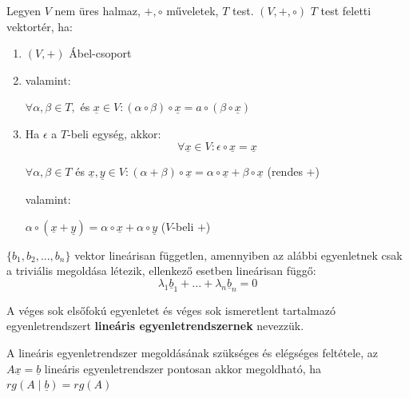 \documentclass[11pt,a4paper]{article}
\begin{document}
\begin{tcolorbox}[colback=blue!5!white,colframe=blue!70!black,title= 3. Vektortér]
    Legyen \(V\) nem üres halmaz, \(+, \circ \) műveletek, \(T\) test. \((V, +, \circ)\) \(T\) test feletti vektortér, ha:
    \begin{enumerate}
        \item \((V, +)\) Ábel-csoport
        \item valamint:
        \begin{center}
        \(\forall \alpha, \beta \in T,\) és \(\underline{x} \in V : (\alpha \circ \beta) \circ \underline{x} = a\circ (\beta \circ \underline{x})\)
        \end{center}
        \item Ha \(\epsilon\)  a \(T\)-beli egység, akkor:
        $$\forall \underline{x} \in V: \epsilon \circ \underline{x} = \underline{x}$$
        \begin{center}
            \(\forall \alpha, \beta \in T \) és \(\underline{x},\underline{y} \in V: (\alpha +\beta) \circ \underline{x} = \alpha \circ \underline{x} + \beta \circ \underline{x}\) (rendes \(+\))
        \end{center}
        valamint: 
        \begin{center}
            \(\alpha \circ (\underline{x}+\underline{y}) = \alpha \circ \underline{x} + \alpha \circ \underline{y}\) (\(V\)-beli \(+\))
        \end{center}
    \end{enumerate}
\end{tcolorbox}
\begin{tcolorbox}[colback=blue!5!white,colframe=blue!70!black,title= 4. Vektorok lineáris függősége és függetlensége]
    \(\{ b_1, b_2, ..., b_n\}\) vektor lineárisan független, amennyiben az alábbi egyenletnek csak a triviális megoldása létezik, ellenkező esetben lineárisan függő:
    $$\lambda_1 \underline{b}_1 +...+\lambda_n \underline{b}_n = 0$$
\end{tcolorbox}
\begin{tcolorbox}[colback=blue!5!white,colframe=blue!70!black,title= 5. Lineáris egyenletrendszer]
    A véges sok elsőfokú egyenletet és véges sok ismeretlent tartalmazó egyenletrendszert \textbf{lineáris egyenletrendszernek} nevezzük.
\end{tcolorbox}
\begin{tcolorbox}[colback=blue!5!white,colframe=blue!70!black,title= 6. Lineáris egyenletrendszer megoldhatóságának szükséges és elégséges feltétele]
    A lineáris egyenletrendszer megoldásának szükséges és elégséges feltétele, az \(A\underline{x}= \underline{b}\) lineáris egyenletrendszer pontosan
akkor megoldható, ha \(rg(A\mid \underline{b})= rg(A)\)
\end{tcolorbox}
\end{document}
